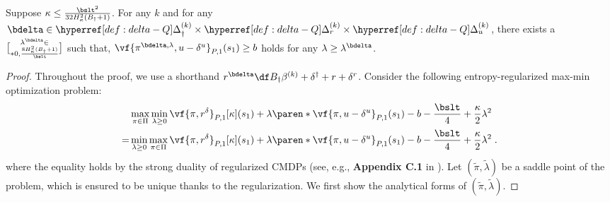 \begin{lemma}\label{lemma:feasible-lambda-exists}
Suppose $\kappa \leq \frac{\bslt^2}{32H_\kappa^2 (B_\dagger + 1)}$.
For any $k$ and for any $\bdelta \in \Deltac\times \Deltar \times \Deltau$, there exists a $\lambda^{\bdelta} \in \brack*{0, \frac{8H_\kappa^2(B_\dagger + 1)}{\bslt}}$ such that, 
\(
\vf{\pi^{\bdelta, \lambda}, u - \delta^u}_{P, 1}(s_1) \geq b
\) holds for any $\lambda \geq \lambda^{\bdelta}$.
\end{lemma}
\begin{proof}
Throughout the proof, we use a shorthand $r^\bdelta \df B_\dagger \beta^{(k)} + \delta^\dagger + r + \delta^r$.
Consider the following entropy-regularized max-min optimization problem:
\begin{align}
&\max_{\pi \in \Pi}\min_{\lambda \geq 0} \vf{\pi, r^\delta}_{P, 1}[\kappa](s_1)  + \lambda \paren*{\vf{\pi, u - \delta^u}_{P, 1}(s_1) - b - \frac{\bslt}{4}} + \frac{\kappa}{2} \lambda^2\nonumber\\
=&\min_{\lambda \geq 0}\max_{\pi \in \Pi} \vf{\pi, r^\delta}_{P, 1}[\kappa](s_1)  + \lambda \paren*{\vf{\pi, u - \delta^u}_{P, 1}(s_1) - b - \frac{\bslt}{4}} + \frac{\kappa}{2} \lambda^2 \;. \label{eq:min-max-duality}
\end{align}
where the equality holds by the strong duality of regularized CMDPs (see, e.g., \textbf{Appendix C.1} in  \citet{ding2023last}).
Let $(\widetilde{\pi}, \widetilde{\lambda})$ be a saddle point of the problem, which is ensured to be unique thanks to the regularization. 
We first show the analytical forms of $(\widetilde{\pi}, \widetilde{\lambda})$.


\end{proof}
